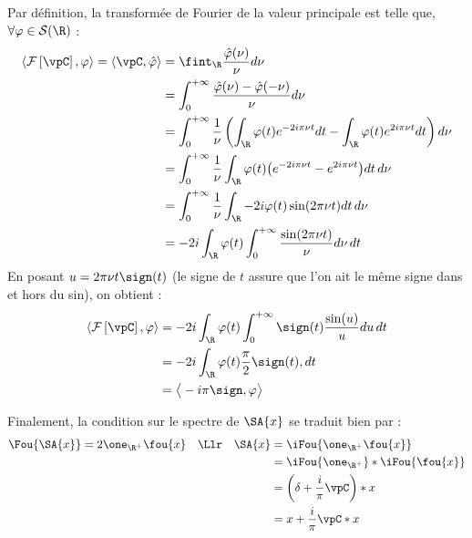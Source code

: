 \begin{annexe}
\begin{demo}
	Par définition, la transformée de Fourier de la valeur principale est telle que,\\ $\forall \varphi\in\mathcal{S}(\R)$ :
	\begin{align*}
		\left\langle \mathcal{F} \left[\vpC \right], \varphi \right\rangle = \left\langle \vpC, \hat{\varphi} \right\rangle 
		&= \fint_\R \frac{\hat{\varphi}(\nu)}{\nu} d\nu \\
		&= \int_0^{+\infty} \frac{\hat{\varphi}(\nu) - \hat{\varphi}(-\nu)}{\nu} d\nu \\
		&= \int_0^{+\infty} \frac{1}{\nu} \left( \int_\R\varphi(t)e^{-2i\pi \nu t}dt - \int_\R\varphi(t)e^{2i\pi \nu t}dt \right)d\nu \\
		&= \int_0^{+\infty} \frac{1}{\nu}\int_\R\varphi(t)\big(e^{-2i\pi \nu t} - e^{2i\pi \nu t}\big)dt\, d\nu \\
		&= \int_0^{+\infty} \frac{1}{\nu}\int_\R-2i\varphi(t)\sin(2\pi \nu t)dt\, d\nu \\
		&= -2i\int_\R\varphi(t)\int_0^{+\infty} \frac{\sin(2\pi \nu t)}{\nu}d\nu\, dt
	\end{align*}
	En posant $u=2\pi\nu t\sign(t)$ (le signe de $t$ assure que l'on ait le même signe dans et hors du sin), on obtient :
	\begin{align*}
		\left\langle \mathcal{F} \left[\vpC \right], \varphi \right\rangle &= -2i\int_\R\varphi(t)\int_0^{+\infty} \sign(t)\frac{\sin(u)}{u}du\, dt \\
		&= -2i\int_\R\varphi(t)\frac{\pi}{2}\sign(t), dt \\
		&= \big\langle -i\pi\sign, \varphi \big\rangle
	\end{align*}
\end{demo}

Finalement, la condition sur le spectre de $\SA{x}$ se traduit bien par :
\begin{align*}
	\Fou{\SA{x}\big.} = 2\one_{\R^+}\fou{x}\quad \Llr\quad \SA{x} &= \iFou{\one_{\R^+}\fou{x}} \\
	&= \iFou{\one_{\R^+}} * \iFou{\fou{x}} \\
	&= \left( \delta + \frac{i}{\pi} \vpC \right) * x \\
	&= x + \frac{i}{\pi} \vpC  * x
\end{align*}
	
\end{annexe}